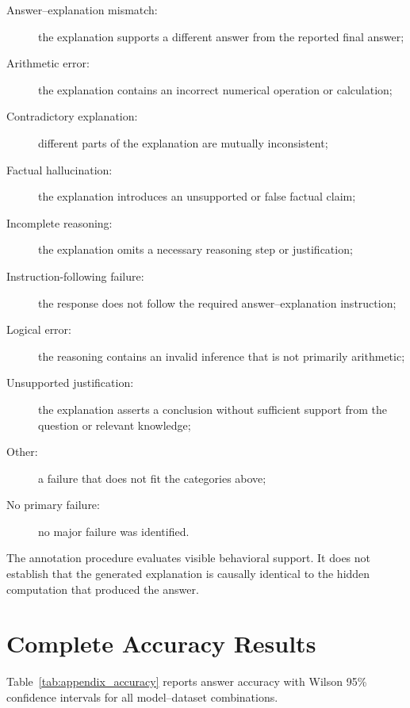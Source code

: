 \documentclass{article}
\begin{document}
\begin{description}
    \item[Answer--explanation mismatch:] the explanation supports a different
    answer from the reported final answer;

    \item[Arithmetic error:] the explanation contains an incorrect numerical
    operation or calculation;

    \item[Contradictory explanation:] different parts of the explanation are
    mutually inconsistent;

    \item[Factual hallucination:] the explanation introduces an unsupported or
    false factual claim;

    \item[Incomplete reasoning:] the explanation omits a necessary reasoning
    step or justification;

    \item[Instruction-following failure:] the response does not follow the
    required answer--explanation instruction;

    \item[Logical error:] the reasoning contains an invalid inference that is
    not primarily arithmetic;

    \item[Unsupported justification:] the explanation asserts a conclusion
    without sufficient support from the question or relevant knowledge;

    \item[Other:] a failure that does not fit the categories above;

    \item[No primary failure:] no major failure was identified.
\end{description}

The annotation procedure evaluates visible behavioral support. It does not
establish that the generated explanation is causally identical to the hidden
computation that produced the answer.

\section{Complete Accuracy Results}
\label{app:accuracy}

Table~\ref{tab:appendix_accuracy} reports answer accuracy with Wilson 95\%
confidence intervals for all model--dataset combinations.
\end{document}
